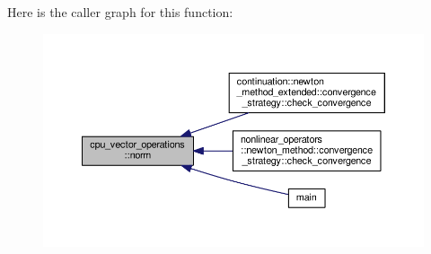 Here is the caller graph for this function\-:\nopagebreak
\begin{figure}[H]
\begin{center}
\leavevmode
\includegraphics[width=350pt]{structcpu__vector__operations_abb4a0ddd5d65ef1ae8c979e71da96ba8_icgraph}
\end{center}
\end{figure}


